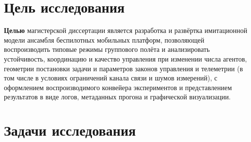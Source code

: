 \documentclass[12pt,a4paper]{article}
\begin{document}
\section*{Цель исследования}

\textbf{Целью} магистерской диссертации является разработка и развёртка
имитационной модели ансамбля беспилотных мобильных платформ,
позволяющей воспроизводить типовые режимы группового полёта и
анализировать устойчивость, координацию и качество управления при
изменении числа агентов, геометрии постановки задачи и параметров
законов управления и телеметрии (в том числе в условиях ограничений
канала связи и шумов измерений), с оформлением воспроизводимого
конвейера экспериментов и представлением результатов в виде
логов, метаданных прогона и графической визуализации.

\section*{Задачи исследования}
\end{document}
